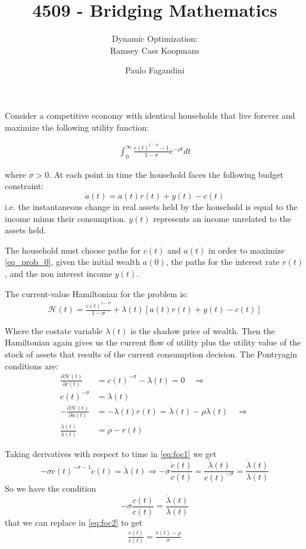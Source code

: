 \documentclass[aspectratio=169]{beamer}
\title[]{4509 - Bridging Mathematics}
\subtitle{Dynamic Optimization:\\Ramsey Cass Koopmans}
\author[P. Fagandini]{Paulo Fagandini}
\institute{}
\date{}
\begin{document}
\begin{frame}

    Consider a competitive economy with identical households that live forever and maximize the following utility function:
    
    \begin{align}
    \int_0^\infty \frac{c(t)^{1-\sigma}-1}{1-\sigma}e^{-\rho t}dt\label{eq_prob_0}
    \end{align} 
    
    where $\sigma>0$. At each point in time the household faces the following budget constraint:
    \[\dot{a}(t)=a(t)r(t)+y(t)-c(t)\]
    i.e. the instantaneous change in real assets held by the household is equal to the income minus their consumption. $y(t)$ represents an income unrelated to the assets held.
\end{frame}

\begin{frame}
    The household must choose paths for $c(t)$ and $a(t)$ in order to maximize \eqref{eq_prob_0}, given the initial wealth $a(0)$, the paths for the interest rate $r(t)$, and the non interest income $y(t)$.
\end{frame}

\begin{frame}
    The current-value Hamiltonian for the problem is:
    \begin{align}
        \mathcal{H}(t)=\frac{c(t)^{1-\sigma}}{1-\sigma}+\lambda(t)[a(t)r(t)+y(t)-c(t)]
    \end{align}
    
    Where the costate variable $\lambda(t)$ is the shadow price of wealth. Then the Hamiltonian again gives us the current flow of utility plus the utility value of the stock of assets that results of the current consumption decision. The Pontryagin conditions are:
    \begin{align}
        \frac{\partial\mathcal{H}(t)}{\partial c(t)}&=c(t)^{-\sigma}-\lambda(t)=0\quad\Rightarrow\nonumber\\
        c(t)^{-\sigma}&=\lambda(t)\label{eq:foc1}\\
        -\frac{\partial\mathcal{H}(t)}{\partial a(t)} &= -\lambda(t)r(t)=\dot{\lambda}(t)-\rho \lambda(t)\quad\Rightarrow\nonumber\\
        \frac{\dot{\lambda}(t)}{\lambda(t)}&=\rho-r(t)\label{eq:foc2}
    \end{align}
\end{frame}

\begin{frame}
    Taking derivatives with respect to time in \eqref{eq:foc1} we get \[-\sigma c(t)^{-\sigma-1}\dot{c}(t)=\dot{\lambda}(t)\Rightarrow -\sigma \frac{\dot{c}(t)}{c(t)}=\frac{\dot{\lambda}(t)}{c(t)^{-\sigma}}=\frac{\dot{\lambda}(t)}{\lambda(t)}\]
    So we have the condition \[-\sigma \frac{\dot{c}(t)}{c(t)}=\frac{\dot{\lambda}(t)}{\lambda(t)}\] that we can replace in \eqref{eq:foc2} to get
    \begin{align}
        \frac{\dot{c}(t)}{c(t)}=\frac{r(t)-\rho}{\sigma}
    \end{align}
\end{frame}
\end{document}
